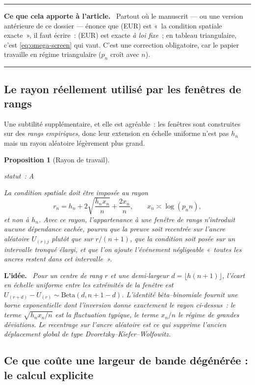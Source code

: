 \documentclass[11pt]{article}
\theoremstyle{plain}
\newtheorem{proposition}[theoreme]{Proposition}
\theoremstyle{definition}
\theoremstyle{remark}
\newcommand{\1}{\mathbf 1}
\newcommand{\statut}[1]{%
  \nopagebreak\par\nopagebreak
  \hfill{\normalfont\footnotesize\textcolor{gris}{statut~: #1}}%
  \par\nopagebreak\vspace{-2pt}}
\newenvironment{idee}
  {\par\medskip\noindent\textcolor{bleu}{\textbf{L'idée.}}\ \itshape}
  {\par\medskip}
\newenvironment{apport}
  {\par\medskip\noindent\begingroup\color{bleu}\rule{\linewidth}{0.6pt}\par
   \nobreak\vspace{2pt}\noindent\textbf{Ce que cela apporte à l'article.}\ \normalcolor}
  {\par\vspace{2pt}\noindent\textcolor{bleu}{\rule{\linewidth}{0.6pt}}\endgroup\par\medskip}
\begin{document}
\begin{apport}
Partout où le manuscrit --- ou une version antérieure de ce dossier ---
énonce que (EUR) est «~la condition spatiale exacte~», il faut écrire~:
(EUR) est exacte \emph{à loi fixe}~; en tableau triangulaire, c'est
\eqref{eq:omega-screen} qui vaut. C'est une correction obligatoire, car
le papier travaille en régime triangulaire ($p_n$ croît avec $n$).
\end{apport}

\subsection{Le rayon réellement utilisé par les fenêtres de rangs}

Une subtilité supplémentaire, et elle est agréable~: les fenêtres sont
construites sur des \emph{rangs empiriques}, donc leur extension en
échelle uniforme n'est pas $h_n$ mais un rayon aléatoire légèrement plus
grand.

\begin{proposition}[Rayon de travail]
\label{prop:rayon}
\statut{A}
La condition spatiale doit être imposée au rayon
\[
 r_n=h_n+2\sqrt{\frac{h_nx_n}{n}}+\frac{2x_n}{n},
 \qquad x_n\asymp\log(p_nn),
\]
et non à $h_n$. Avec ce rayon, l'appartenance à une fenêtre de rangs
n'introduit \emph{aucune} dépendance cachée, pourvu que la preuve soit
recentrée sur l'ancre aléatoire $U_{(r)j}$ plutôt que sur $r/(n+1)$, que
la condition soit posée sur un intervalle tronqué élargi, et que l'on
ajoute l'événement négligeable «~toutes les ancres restent dans cet
intervalle~».
\end{proposition}

\begin{idee}
Pour un centre de rang $r$ et une demi-largeur $d=\lfloor h(n+1)\rfloor$,
l'écart en échelle uniforme entre les extrémités de la fenêtre est
$U_{(r+d)}-U_{(r)}\sim\mathrm{Beta}(d,n+1-d)$. L'identité
bêta--binomiale fournit une borne exponentielle dont l'inversion donne
exactement le rayon ci-dessus~: le terme $\sqrt{h_nx_n/n}$ est la
fluctuation typique, le terme $x_n/n$ le régime de grandes déviations. Le
recentrage sur l'ancre \emph{aléatoire} est ce qui supprime l'ancien
déplacement global de type Dvoretzky--Kiefer--Wolfowitz.
\end{idee}

\subsection{Ce que coûte une largeur de bande dégénérée : le calcul explicite}
\end{document}
